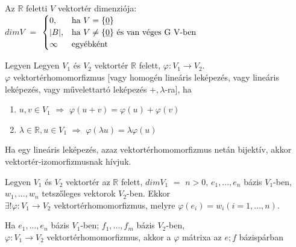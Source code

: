 \begin{frame}
		\begin{tcolorbox}[title={Def.: Vektortér dimenziója}]
 			Az $\mathbb{R}$ feletti $V$ vektortér dimenziója:\\
 			
			$dim V$ $=$ $\begin{cases}
   				0,				& \text{ha } V = \{ \underline{0} \}\\
    				|B|,                & \text{ha } V \neq \{ \underline{0} \} \text{ és van véges G V-ben } \\
    				\infty  & \text{egyébként}
			\end{cases}$	
		\end{tcolorbox}	
	\end{frame}
	
	\begin{frame}
		\begin{tcolorbox}[title={Def.: Vektortérhomomorfizmus, Vektortérizomorfizmus}]
 			Legyen Legyen $V_1$ és $V_2$ vektortér $\mathbb{R}$ felett, $\varphi : V_1 \rightarrow V_2$.\\
 			$\varphi$ vektortérhomomorfizmus [vagy homogén lineáris leképezés, vagy lineáris leképezés, vagy művelettartó leképezés $+, \lambda$-ra], ha\\
 			
 			\begin{enumerate}
 			\item $u, v \in V_1$ $\Rightarrow$ $\varphi(u + v) = \varphi(u) + \varphi(v)$
			\item ${\lambda} \in \mathbb{R}, u \in V_1$ $\Rightarrow$ ${\varphi}({\lambda}u) = {\lambda}{\varphi}(u)$
 			\end{enumerate}

			Ha egy lineáris leképezés, azaz vektortérhomomorfizmus netán bijektív, akkor vektortér-izomorfizmusnak hívjuk.
		\end{tcolorbox}	
		
		\begin{tcolorbox}[title={Tétel: Egyértelmű kiterjesztés tétel}]
 			Legyen $V_1$ és $V_2$ vektortér az $\mathbb{R}$ felett, $dim V_1$ $=$ $n > 0$, $e_1, ..., e_n$ bázis $V_1$-ben, $w_1, ..., w_n$ tetszőleges vektorok $V_2$-ben. Ekkor\\
 			
			${\exists}! \varphi : V_1 \rightarrow V_2$ vektortérhomomorfizmus, melyre $\varphi(e_i) = w_i (i = 1, ..., n)$.
		\end{tcolorbox}	
	
		\begin{tcolorbox}[title={Def.: Vektortérhomomorfizmus mátrixa}]
 			Ha $e_1, ..., e_n$ bázis $V_1$-ben; $f_1, ..., f_m$ bázis $V_2$-ben,\\
 			$\varphi : V_1 \rightarrow V_2$ vektortérhomomorfizmus, akkor a $\varphi$ mátrixa az $e; f$ bázispárban\\
 			\mmedskip


\end{tcolorbox}
\end{frame}
